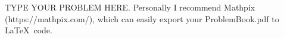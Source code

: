 \documentclass{yourmommaaintgotno}
\begin{document}
\begin{problem}{TYPE YOUR PROBLEM HERE.}
Personally I recommend Mathpix (https://mathpix.com/),
which can easily export your ProblemBook.pdf to \LaTeX \ code.
\end{problem}
\end{document}
